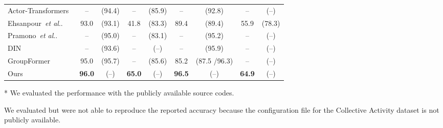 \documentclass[runningheads]{llncs}
\makeatletter
\DeclareRobustCommand\onedot{\futurelet\@let@token\@onedot}
\def\@onedot{\ifx\@let@token.\else.\null\fi\xspace}
\def\etal{\emph{et al}\onedot}
\makeatother
\begin{document}
\begin{table}[t]
\begin{threeparttable}
\begin{tabular}{@{}lcccccccc@{}}
   Actor-Transformers~\cite{gavrilyuk_cvpr2020} & -- & (94.4) & -- & (85.9) & -- & (92.8) & -- & (\hspace{0.6em}--\hspace{0.6em}) \\
   Ehsanpour~\etal~\cite{ehsanpour_eccv2020} & 93.0 & (93.1) & 41.8 & (83.3) & 89.4 & (89.4) & 55.9 & (78.3) \\
   Pramono~\etal~\cite{pramono_eccv2020} & -- & (95.0) & -- & (83.1) & -- & (95.2) & -- & (\hspace{0.6em}--\hspace{0.6em}) \\
   DIN~\cite{yuan_iccv2021} & -- & (93.6) & -- & (\hspace{0.6em}--\hspace{0.6em}) & -- & (95.9) & -- & (\hspace{0.6em}--\hspace{0.6em}) \\
   GroupFormer~\cite{li_iccv2021} & 95.0\tnote{*} & (95.7) & -- & (85.6) & 85.2\tnote{*} & (87.5\tnote{\dag} /96.3) & -- & (\hspace{0.6em}--\hspace{0.6em}) \\
   \midrule
   Ours & \textbf{96.0} & (\hspace{0.6em}--\hspace{0.6em}) & \textbf{65.0} & (\hspace{0.6em}--\hspace{0.6em}) & \textbf{96.5} & (\hspace{0.6em}--\hspace{0.6em}) & \textbf{64.9} & (\hspace{0.6em}--\hspace{0.6em}) \\
   \bottomrule
  \end{tabular}
  \begin{tablenotes}\footnotesize
   \item[*] We evaluated the performance with the publicly available source codes.
   \item[\dag] We evaluated but were not able to reproduce the reported accuracy because the configuration file for the Collective Activity dataset is not publicly available.
  \end{tablenotes}
 \end{threeparttable}
 \vspace{-1.0em}
\end{table}
\end{document}
